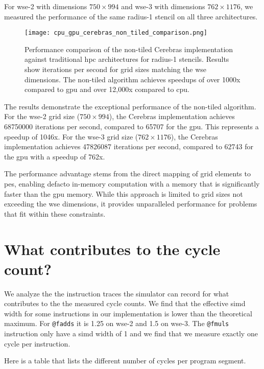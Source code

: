 For \ac{wse}-2 with dimensions $750 \times 994$ and \ac{wse}-3 with dimensions $762 \times 1176$, we measured the performance of the same radius-1 stencil on all three architectures.

\begin{figure}[h]
    \centering
    \texttt{[image: cpu\_gpu\_cerebras\_non\_tiled\_comparison.png]}
    \caption{Performance comparison of the non-tiled Cerebras implementation against traditional \ac{hpc} architectures for radius-1 stencils. Results show iterations per second for grid sizes matching the \ac{wse} dimensions. The non-tiled algorithm achieves speedups of over 1000x compared to \ac{gpu} and over 12,000x compared to \ac{cpu}.}
    \label{fig:cpu_gpu_cerebras_non_tiled_comparison}
\end{figure}

The results demonstrate the exceptional performance of the non-tiled algorithm. For the \ac{wse}-2 grid size ($750 \times 994$), the Cerebras implementation achieves \num{68750000} iterations per second, compared to \num{65707} for the \ac{gpu}. This represents a speedup of 1046x.
For the \ac{wse}-3 grid size ($762 \times 1176$), the Cerebras implementation achieves \num{47826087} iterations per second, compared to \num{62743} for the \ac{gpu} with a speedup of 762x.

The performance advantage stems from the direct mapping of grid elements to \acp{pe}, enabling defacto in-memory computation with a memory that is significantly faster than the \ac{gpu} memory. While this approach is limited to grid sizes not exceeding the \ac{wse} dimensions, it provides unparalleled performance for problems that fit within these constraints.

\section{What contributes to the cycle count?}
We analyze the the instruction traces the simulator can record for what contributes to the the measured cycle counts.
We find that the effective simd width for some instructions in our implementation is lower than the theoretical maximum.
For \texttt{@fadds} it is 1.25 on wse-2 and 1.5 on wse-3.
The \texttt{@fmuls} instruction only have a simd width of 1 and we find that we measure exactly one cycle per instruction.

Here is a table that lists the different number of cycles per program segment. 